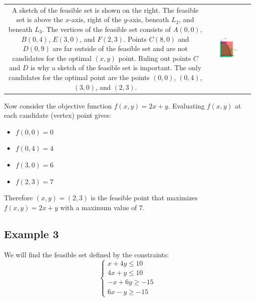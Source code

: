 \documentclass{article}
\begin{document}
\begin{tabular}{cc}
\parbox{0.5\textwidth}{
A sketch of the feasible set is shown on the right. The feasible set is above the \(x\)-axis, right of the \(y\)-axis, beneath \(L_2\), and beneath \(L_3\). The vertices of the feasible set consists of \(A(0,0)\), \(B(0,4)\), \(E(3,0)\), and \(F(2,3)\). Points \(C(8,0)\) and \(D(0,9)\) are far outside of the feasible set and are not candidates for the optimal \((x, y)\) point. Ruling out points \(C\) and \(D\) is why a sketch of the feasible set is important. The only candidates for the optimal point are the points \((0,0)\), \((0,4)\), \((3,0)\), and \((2,3)\). 
} & \parbox{0.5\textwidth}{
\includegraphics[width = 0.5\textwidth]{feasible_set_2}
}
\end{tabular}

Now consider the objective function \(f(x, y) = 2x + y\). Evaluating \(f(x, y)\) at each candidate (vertex) point gives:
\begin{itemize}
\item \(f(0, 0) = 0\)
\item \(f(0, 4) = 4\)
\item \(f(3, 0) = 6\)
\item \(f(2, 3) = 7\)
\end{itemize} 
Therefore \((x, y) = (2, 3)\) is the feasible point that maximizes \(f(x, y) = 2x + y\) with a maximum value of \(7\).



\subsection*{Example 3}

We will find the feasible set defined by the constraints:
\[\left\{\begin{array}{c} 
x + 4y \leq 10 \\
4x + y \leq 10 \\
-x + 6y \geq -15 \\
6x - y \geq -15
\end{array}\right.\]
\end{document}
